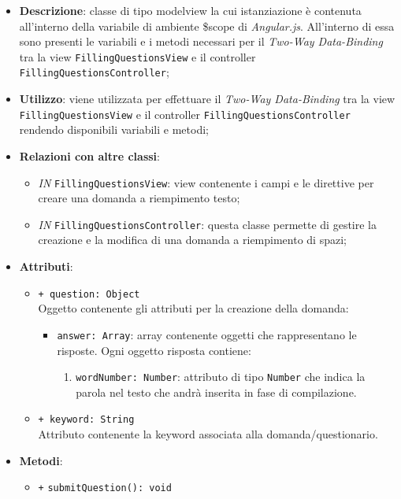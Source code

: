 \begin{itemize}
	\item \textbf{Descrizione}: classe di tipo modelview la cui istanziazione è contenuta all'interno della variabile di ambiente \$scope di \textit{Angular.js}. All'interno di essa sono presenti le variabili e i metodi necessari per il \textit{Two-Way Data-Binding} tra la view \texttt{FillingQuestionsView} e il controller \texttt{FillingQuestionsController}; 
	\item \textbf{Utilizzo}: viene utilizzata per effettuare il \textit{Two-Way Data-Binding} tra la view \texttt{FillingQuestionsView} e il controller \texttt{FillingQuestionsController} rendendo disponibili variabili e metodi;
	\item \textbf{Relazioni con altre classi}:
	\begin{itemize}
		\item \textit{IN} \texttt{FillingQuestionsView}: view contenente i campi e le direttive per creare una domanda a riempimento testo; 
		\item \textit{IN} \texttt{FillingQuestionsController}: questa classe permette di gestire la creazione e la modifica di una domanda a riempimento di spazi;
	\end{itemize}
	\item \textbf{Attributi}:
	\begin{itemize}
		\item \texttt{+ question: Object} \\ Oggetto contenente gli attributi per la creazione della domanda:
		\begin{itemize}
			\item \texttt{answer: Array}: array contenente oggetti che rappresentano le risposte. Ogni oggetto risposta contiene:
			\begin{enumerate}
				\item \texttt{wordNumber: Number}: attributo di tipo \texttt{Number} che indica la parola nel testo che andrà inserita in fase di compilazione.
			\end{enumerate}
		\end{itemize}
		\item \texttt{+ keyword: String} \\ Attributo contenente la keyword associata alla domanda/questionario.
	\end{itemize}
	\item \textbf{Metodi}:
	\begin{itemize}
			\item \texttt{+} \texttt{submitQuestion(): void}\\ 

\end{itemize}
\end{itemize}

